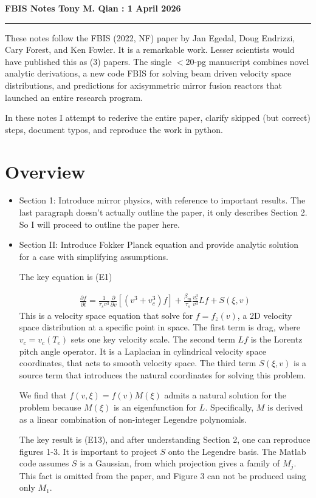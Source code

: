 \documentclass{article}
\numberwithin{equation}{section}
\newcommand\pd[2]{ \frac{\partial #1}{\partial #2} }
\newcommand\nl{\vskip 10pt \noindent}
\newcommand\eq[1]{
    \begin{equation}
        \begin{split} #1 \end{split}
    \end{equation} }
\newcommand\myTitle[1] {
	\noindent \textbf{#1 \hfill Tony M. Qian  : 1 April 2026 } 
	\\ \hrule \nl
}
\begin{document}
	
\myTitle{FBIS Notes}
These notes follow the FBIS (2022, NF) paper by Jan Egedal, Doug Endrizzi, Cary Forest, and Ken Fowler. It is a remarkable work. Lesser scientists would have published this as (3) papers. The single $<$20-pg manuscript combines novel analytic derivations, a new code FBIS for solving beam driven velocity space distributions, and predictions for axisymmetric mirror fusion reactors that launched an entire research program.

In these notes I attempt to rederive the entire paper, clarify skipped (but correct) steps, document typos, and reproduce the work in python.

\section{Overview}
\begin{itemize}
	\item Section 1: Introduce mirror physics, with reference to important results. The last paragraph doesn't actually outline the paper, it only describes Section 2. So I will proceed to outline the paper here.
	
	\item Section II: Introduce Fokker Planck equation and provide analytic solution for a case with simplifying assumptions.
	
	The key equation is (E1) 
	\eq{
		\pd{f}{t} = \frac{1}{\tau_s v^3} \pd{}{v} [(v^3 + v_c^3)f] + \frac{\beta_m}{\tau_s} \frac{v_c^3}{v^3} L f + S(\xi,v)
	}
	This is a velocity space equation that solve for $f = f_z(v)$, a 2D velocity space distribution at a specific point in space. The first term is drag, where $v_c = v_c(T_e)$ sets one key velocity scale. The second term $Lf$ is the Lorentz pitch angle operator. It is a Laplacian in cylindrical velocity space coordinates, that acts to smooth velocity space. The third term $S(\xi,v)$ is a source term that introduces the natural coordinates for solving this problem.

	We find that $f(v,\xi) = f(v)M(\xi)$ admits a natural solution for the problem because $M(\xi)$ is an eigenfunction for $L$. Specifically, $M$ is derived as a linear combination of non-integer Legendre polynomials.

	The key result is (E13), and after understanding Section 2, one can reproduce figures 1-3. It is important to project $S$ onto the Legendre basis. The Matlab code assumes $S$ is a Gaussian, from which projection gives a family of $M_j$. This fact is omitted from the paper, and Figure 3 can not be produced using only $M_1$.


\end{itemize}
\end{document}
